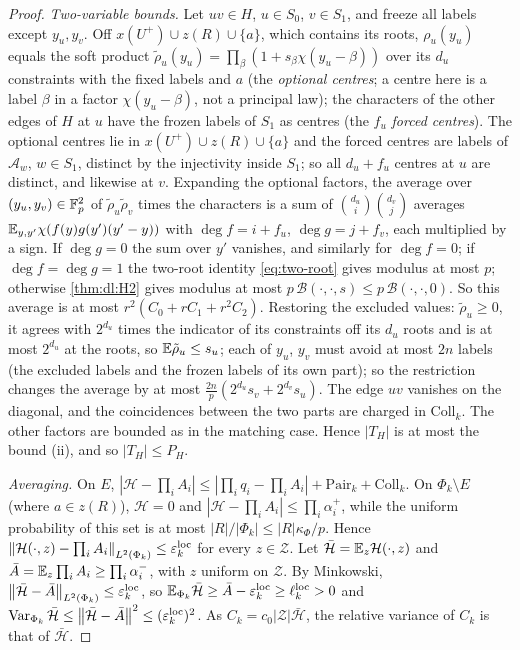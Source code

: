 \begin{proof}
\emph{Two-variable bounds.} Let $uv\in H$, $u\in S_0$, $v\in S_1$, and freeze all labels
except $y_u,y_v$. Off $x(U^+)\cup z(R)\cup\{a\}$, which contains its roots, $\rho_u(y_u)$
equals the soft product $\tilde\rho_u(y_u)=\prod_\beta(1+s_\beta\chi(y_u-\beta))$ over its $d_u$ constraints
with the fixed labels and $a$ (the \emph{optional centres}; a
centre here is a label $\beta$ in a factor $\chi(y_u-\beta)$, not
a principal law); the characters of the other edges of $H$ at $u$
have the frozen labels of $S_1$ as centres (the $f_u$ \emph{forced
centres}). The optional centres lie in $x(U^+)\cup z(R)\cup\{a\}$
and the forced centres are labels of $\mathcal A_w$, $w\in S_1$,
distinct by the injectivity inside $S_1$; so all $d_u+f_u$ centres
at $u$ are distinct, and likewise at $v$. Expanding the optional
factors, the average over $(y_u,y_v)\in\mathbb F_p^2$ of
$\tilde\rho_u\tilde\rho_v$ times the characters is a sum of
$\binom{d_u}i\binom{d_v}j$ averages $\mathbb E_{y,y'}\chi(f(y)g(y')(y'-y))$ with
$\deg f=i+f_u$, $\deg g=j+f_v$, each multiplied by a sign. If $\deg g=0$ the sum
over $y'$ vanishes, and similarly for $\deg f=0$; if $\deg f=\deg g=1$ the
two-root identity \eqref{eq:two-root} gives modulus at most $p$; otherwise
\cref{thm:dl:H2} gives modulus at most $p\,\mathcal B(\cdot,\cdot,s)\le p\,\mathcal B(\cdot,\cdot,0)$.
So this average is at most $r^2(C_0+rC_1+r^2C_2)$. Restoring the excluded values:
$\tilde\rho_u\ge0$, it agrees with $2^{d_u}$ times the indicator of its constraints off
its $d_u$ roots and is at most $2^{d_u}$ at the roots, so
$\mathbb E\tilde\rho_u\le s_u$; each of $y_u$, $y_v$ must avoid at most $2n$ labels (the
excluded labels and the frozen labels of its own part); so the restriction changes
the average by at most $\frac{2n}p(2^{d_u}s_v+2^{d_v}s_u)$. The edge $uv$ vanishes on
the diagonal, and the coincidences between the two parts are charged in
$\mathrm{Coll}_k$. The other factors are bounded as in the matching case. Hence $|T_H|$
is at most the bound (ii), and so $|T_H|\le P_H$.

\emph{Averaging.} On $E$,
$|\mathcal H-\prod_iA_i|\le|\prod_iq_i-\prod_iA_i|+\mathrm{Pair}_k+\mathrm{Coll}_k$. On
$\Phi_k\setminus E$ (where $a\in z(R)$), $\mathcal H=0$ and $|\mathcal H-\prod_iA_i|\le\prod_i\alpha^+_i$,
while the uniform probability of this set is at most $|R|/|\Phi_k|\le|R|\kappa_\Phi/p$.
Hence $\left\|\mathcal H(\cdot,z)-\prod_iA_i\right\|_{L^2(\Phi_k)}\le\varepsilon^{\rm loc}_k$ for every
$z\in\mathcal Z$. Let $\bar{\mathcal H}=\mathbb E_z\mathcal H(\cdot,z)$ and $\bar A=\mathbb E_z\prod_iA_i\ge\prod_i\alpha^-_i$,
with $z$ uniform on $\mathcal Z$. By Minkowski,
$\left\|\bar{\mathcal H}-\bar A\right\|_{L^2(\Phi_k)}\le\varepsilon^{\rm loc}_k$, so
$\mathbb E_{\Phi_k}\bar{\mathcal H}\ge\bar A-\varepsilon^{\rm loc}_k\ge\ell^{\rm loc}_k>0$ and
$\operatorname{Var}_{\Phi_k}\bar{\mathcal H}\le\left\|\bar{\mathcal H}-\bar A\right\|^2\le(\varepsilon^{\rm loc}_k)^2$. As
$C_k=c_0|\mathcal Z|\bar{\mathcal H}$, the relative variance of $C_k$ is that of $\bar{\mathcal H}$.
\end{proof}

